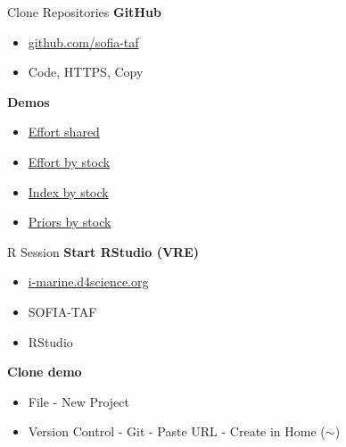 \documentclass[aspectratio=169]{beamer}
\begin{document}
\begin{frame}{Clone Repositories}
  \textbf{\darkgreen GitHub}\\[0.5ex]
  \begin{itemize}\blue
    \item[] \href{https://github.com/sofia-taf}{github.com/sofia-taf}\\[1ex]
    \item[] Code, HTTPS, Copy\\[1ex]
  \end{itemize}
  \vspace{3ex}
  \textbf{\darkgreen Demos}\\[0.5ex]
  \begin{itemize}\blue
    \item[] \href{https://github.com/sofia-taf/WorkshopEffortShared}{Effort
      shared}\\[1ex]
    \item[] \href{https://github.com/sofia-taf/WorkshopEffortByStock}{Effort by
      stock}\\[1ex]
    \item[] \href{https://github.com/sofia-taf/WorkshopIndexByStock}{Index by
      stock}\\[1ex]
    \item[] \href{https://github.com/sofia-taf/WorkshopPriorsByStock}{Priors by
      stock}
  \end{itemize}
\end{frame}


\begin{frame}{R Session}
  \textbf{\darkgreen Start RStudio (VRE)}\\[0.3ex]
  \begin{itemize}
    \item[] {\blue\href{https://i-marine.d4science.org/}%
      {i-marine.d4science.org}}\\[1ex]
    \item[] SOFIA-TAF\\[1ex]
    \item[] RStudio\\[1ex]
  \end{itemize}
  \vspace{4ex}
  \textbf{\darkgreen Clone demo}\\[0.3ex]
  \begin{itemize}
    \item[] File - New Project\\[1ex]
    \item[] Version Control - Git - Paste URL - Create in Home ($\sim$)\\[1ex]
  \end{itemize}
\end{frame}
\end{document}
